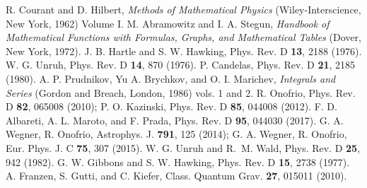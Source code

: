 \documentclass[twocolumn,prd,aps,showpacs,amsmath,amssymb]{revtex4-1}
\begin{document}
\begin{thebibliography}{99}
%
 R. Courant and D. Hilbert, {\it Methods of
    Mathematical Physics} (Wiley-Interscience, New York, 1962) Volume
  I. 
%
 M. Abramowitz and I. A. Stegun, {\it Handbook of Mathematical Functions with Formulas, Graphs, and Mathematical
Tables} (Dover, New York, 1972).
%
 J. B. Hartle and S. W. Hawking, Phys. Rev. D {\bf 13}, 2188 (1976).
%
 W. G. Unruh,  Phys. Rev. D {\bf 14}, 870 (1976).
%
 P. Candelas, Phys. Rev. D {\bf 21}, 2185 (1980).
%
 A. P. Prudnikov, Yu A. Brychkov, and O. I. Marichev, {\it Integrals and Series} (Gordon and Breach, London, 1986) vols. 1 and 2. 
%
 R. Onofrio, Phys. Rev. D {\bf 82}, 065008 (2010);  
P. O. Kazinski, Phys. Rev. D {\bf 85}, 044008 (2012).
%
 F. D. Albareti, A. L. Maroto, and F. Prada, Phys. Rev. D {\bf 95}, 044030 (2017).
% 
 G. A. Wegner, R. Onofrio, Astrophys. J. {\bf 791}, 125 (2014); 
G. A. Wegner, R. Onofrio, Eur. Phys. J. C {\bf 75}, 307 (2015).
%
 W. G. Unruh and R.~M. Wald,  Phys. Rev. D {\bf 25}, 942 (1982). 
%
 G. W. Gibbons and S. W. Hawking, Phys. Rev. D {\bf 15}, 2738 (1977).
%
 A. Franzen, S. Gutti, and C. Kiefer, Class. Quantum Grav. {\bf 27}, 015011 (2010).

\end{thebibliography}
\end{document}
